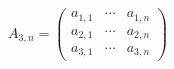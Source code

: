 \documentclass[10pt,twoside,english,a4paper]{article}
\begin{document}
\begin{displaymath}
	A_{3,n} = 
	\begin{pmatrix}
		a_{1,1} & \cdots & a_{1,n} \\
		a_{2,1} & \cdots & a_{2,n} \\
		a_{3,1} & \cdots & a_{3,n}
	\end{pmatrix}
\end{displaymath}




% 
\end{document}
